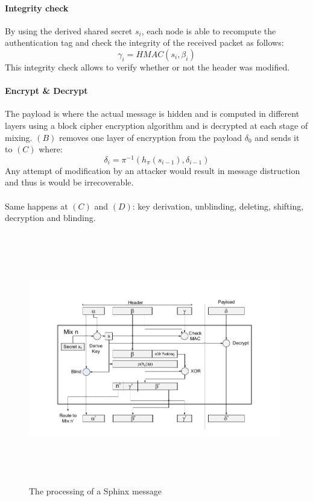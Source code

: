 \paragraph{Integrity check}
By using the derived shared secret $s_i$, each node is able to recompute the authentication tag and check the integrity of the received packet as follows: $$\gamma_i=HMAC(s_i,\beta_i)$$
This integrity check allows to verify whether or not the header was modified.
\paragraph{Encrypt \& Decrypt}
The payload is where the actual message is hidden and is computed in different layers using a block cipher encryption algorithm and is decrypted at each stage of mixing. $(B)$ removes one layer of encryption from the payload $\delta_0$ and sends it to $(C)$ where:
$$\delta_i=\pi^{-1}(h_{\pi}(s_{i-1}), \delta_{i-1})$$
Any attempt of modification by an attacker would result in message distruction and thus is would be irrecoverable.
\\~\\Same happens at $(C)$ and $(D)$: key derivation, unblinding, deleting, shifting, decryption and blinding.
\begin{figure}[H]
    \centering
    \includegraphics[width=11cm,height=11cm,keepaspectratio]{../yellowpaper/images/sphinx1.png}
    \caption{The processing of a Sphinx message}
    \label{fig:The processing of a Sphinx message }
\end{figure}
